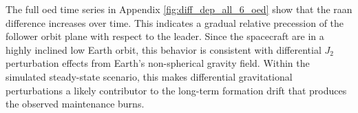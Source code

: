 The full \gls{oed} time series in Appendix \ref{fig:diff_dep_all_6_oed} show that the \gls{raan} difference increases over time. This indicates a gradual relative precession of the follower orbit plane with respect to the leader. Since the spacecraft are in a highly inclined low Earth orbit, this behavior is consistent with differential $J_2$ perturbation effects from Earth's non-spherical gravity field. Within the simulated steady-state scenario, this makes differential gravitational perturbations a likely contributor to the long-term formation drift that produces the observed maintenance burns.

